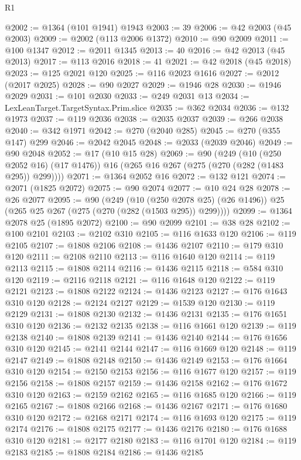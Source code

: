 \begin{lexlean}{R1}
\begin{coremodule}
@2002 := @1364 (@101 @1941) @1943
@2003 := 39
@2006 := @42 @2003 (@45 @2003)
@2009 := @2002 (@113 @2006 @1372)
@2010 := @90 @2009
@2011 := @100 @1347
@2012 := @2011 @1345
@2013 := 40
@2016 := @42 @2013 (@45 @2013)
@2017 := @113 @2016
@2018 := 41
@2021 := @42 @2018 (@45 @2018)
@2023 := @125 @2021 @120
@2025 := @116 @2023 @1616
@2027 := @2012 (@2017 @2025)
@2028 := @90 @2027
@2029 := @1946 @28
@2030 := @1946 @2029
@2031 := @101 @2030
@2033 := @249 @2031 @13
@2034 := LexLeanTarget.TargetSyntax.Prim.slice
@2035 := @362 @2034
@2036 := @132 @1973
@2037 := @119 @2036
@2038 := @2035 @2037
@2039 := @266 @2038
@2040 := @342 @1971
@2042 := @270 (@2040 @285)
@2045 := @270 (@355 @147) @299
@2046 := @2042 @2045
@2048 := @2033 (@2039 @2046)
@2049 := @90 @2048
@2052 := @17 (@10 @15 @28)
@2069 := @90
    (@249
      (@10 (@250 @2052 @16) (@17 @1476))
      @16
      (@265 @16 @267 (@275 (@270 (@282 (@1483 @295)) @299))))
@2071 := @1364 @2052 @16
@2072 := @132 @121
@2074 := @2071 (@1825 @2072)
@2075 := @90 @2074
@2077 := @10 @24 @28
@2078 := @26 @2077
@2095 := @90
    (@249
      (@10 (@250 @2078 @25) (@26 @1496))
      @25
      (@265 @25 @267 (@275 (@270 (@282 (@1503 @295)) @299))))
@2099 := @1364 @2078 @25 (@1895 @2072)
@2100 := @90 @2099
@2101 := @38 @28
@2102 := @100 @2101
@2103 := @2102 @310
@2105 := @116 @1633 @120
@2106 := @119 @2105
@2107 := @1808 @2106
@2108 := @1436 @2107
@2110 := @179 @310 @120
@2111 := @2108 @2110
@2113 := @116 @1640 @120
@2114 := @119 @2113
@2115 := @1808 @2114
@2116 := @1436 @2115
@2118 := @584 @310 @120
@2119 := @2116 @2118
@2121 := @116 @1648 @120
@2122 := @119 @2121
@2123 := @1808 @2122
@2124 := @1436 @2123
@2127 := @176 @1643 @310 @120
@2128 := @2124 @2127
@2129 := @1539 @120
@2130 := @119 @2129
@2131 := @1808 @2130
@2132 := @1436 @2131
@2135 := @176 @1651 @310 @120
@2136 := @2132 @2135
@2138 := @116 @1661 @120
@2139 := @119 @2138
@2140 := @1808 @2139
@2141 := @1436 @2140
@2144 := @176 @1656 @310 @120
@2145 := @2141 @2144
@2147 := @116 @1669 @120
@2148 := @119 @2147
@2149 := @1808 @2148
@2150 := @1436 @2149
@2153 := @176 @1664 @310 @120
@2154 := @2150 @2153
@2156 := @116 @1677 @120
@2157 := @119 @2156
@2158 := @1808 @2157
@2159 := @1436 @2158
@2162 := @176 @1672 @310 @120
@2163 := @2159 @2162
@2165 := @116 @1685 @120
@2166 := @119 @2165
@2167 := @1808 @2166
@2168 := @1436 @2167
@2171 := @176 @1680 @310 @120
@2172 := @2168 @2171
@2174 := @116 @1693 @120
@2175 := @119 @2174
@2176 := @1808 @2175
@2177 := @1436 @2176
@2180 := @176 @1688 @310 @120
@2181 := @2177 @2180
@2183 := @116 @1701 @120
@2184 := @119 @2183
@2185 := @1808 @2184
@2186 := @1436 @2185

\end{coremodule}
\end{lexlean}
